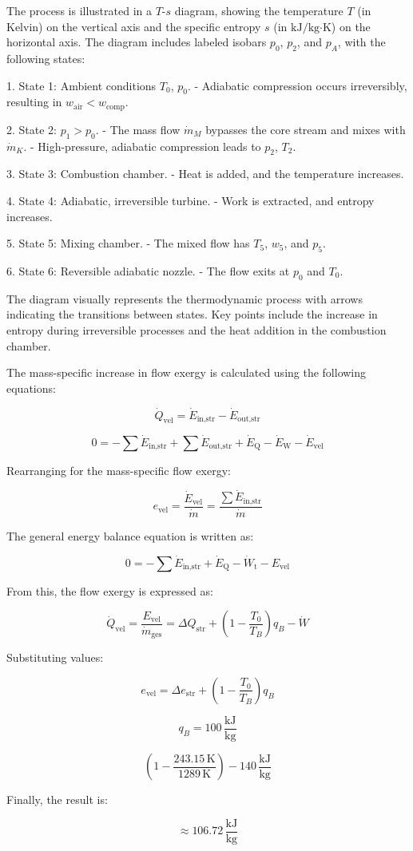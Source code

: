The process is illustrated in a \( T \)-\( s \) diagram, showing the temperature \( T \) (in Kelvin) on the vertical axis and the specific entropy \( s \) (in \( \text{kJ}/\text{kg·K} \)) on the horizontal axis. The diagram includes labeled isobars \( p_0 \), \( p_2 \), and \( p_A \), with the following states:  

1. State 1: Ambient conditions \( T_0 \), \( p_0 \).  
   - Adiabatic compression occurs irreversibly, resulting in \( w_{\text{air}} < w_{\text{comp}} \).  

2. State 2: \( p_1 > p_0 \).  
   - The mass flow \( \dot{m}_M \) bypasses the core stream and mixes with \( \dot{m}_K \).  
   - High-pressure, adiabatic compression leads to \( p_2 \), \( T_2 \).  

3. State 3: Combustion chamber.  
   - Heat is added, and the temperature increases.  

4. State 4: Adiabatic, irreversible turbine.  
   - Work is extracted, and entropy increases.  

5. State 5: Mixing chamber.  
   - The mixed flow has \( T_5 \), \( w_5 \), and \( p_5 \).  

6. State 6: Reversible adiabatic nozzle.  
   - The flow exits at \( p_0 \) and \( T_0 \).  

The diagram visually represents the thermodynamic process with arrows indicating the transitions between states. Key points include the increase in entropy during irreversible processes and the heat addition in the combustion chamber.

The mass-specific increase in flow exergy is calculated using the following equations:  

\[
\dot{Q}_{\text{vel}} = \dot{E}_{\text{in,str}} - \dot{E}_{\text{out,str}}
\]

\[
0 = -\sum \dot{E}_{\text{in,str}} + \sum \dot{E}_{\text{out,str}} + \dot{E}_{\text{Q}} - \dot{E}_{\text{W}} - \dot{E}_{\text{vel}}
\]

Rearranging for the mass-specific flow exergy:  

\[
e_{\text{vel}} = \frac{\dot{E}_{\text{vel}}}{\dot{m}} = \frac{\sum \dot{E}_{\text{in,str}}}{\dot{m}}
\]

The general energy balance equation is written as:  

\[
0 = -\sum \dot{E}_{\text{in,str}} + \dot{E}_{\text{Q}} - \dot{W}_{\text{t}} - E_{\text{vel}}
\]

From this, the flow exergy is expressed as:  

\[
\dot{Q}_{\text{vel}} = \frac{E_{\text{vel}}}{\dot{m}_{\text{ges}}} = \Delta Q_{\text{str}} + \left(1 - \frac{T_0}{T_B}\right) q_B - \dot{W}
\]

Substituting values:  

\[
e_{\text{vel}} = \Delta e_{\text{str}} + \left(1 - \frac{T_0}{T_B}\right) q_B
\]

\[
q_B = 100 \, \frac{\text{kJ}}{\text{kg}}
\]

\[
\left(1 - \frac{243.15 \, \text{K}}{1289 \, \text{K}}\right) - 140 \, \frac{\text{kJ}}{\text{kg}}
\]

Finally, the result is:  

\[
\approx 106.72 \, \frac{\text{kJ}}{\text{kg}}
\]